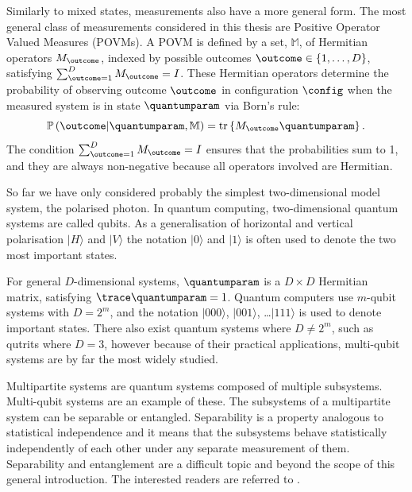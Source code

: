 Similarly to mixed states, measurements also have a more general form. The most general class of measurements considered in this thesis are Positive Operator Valued Measures (POVMs). A POVM is defined by a set, $\mathbb{M}$, of Hermitian operators $M_{\outcome}$, indexed by possible outcomes $\outcome\in\{1,\ldots,D\}$, satisfying $\sum_{\outcome=1}^{D} M_{\outcome} = I$. These Hermitian operators determine the probability of observing outcome $\outcome$ in configuration $\config$ when the measured system is in state $\quantumparam$ via Born's rule:
%
\begin{equation}
	\mathbb{P}\left(\outcome\vert\quantumparam,\mathbb{M}\right) = \text{tr}\left\{M_{\outcome}\quantumparam \right\}.
\end{equation}
%
The condition $\sum_{\outcome=1}^{D} M_{\outcome} = I$ ensures that the probabilities sum to 1, and they are always non-negative because all operators involved are Hermitian.

So far we have only considered probably the simplest two-dimensional model system, the polarised photon. In quantum computing, two-dimensional quantum systems are called qubits. As a generalisation of horizontal and vertical polarisation $\vert H \rangle$ and $\vert V \rangle$ the notation $\vert 0 \rangle$ and $\vert 1 \rangle$ is often used to denote the two most important states.

For general $D$-dimensional systems, $\quantumparam$ is a $D \times D$ Hermitian matrix, satisfying $\trace\quantumparam = 1$. Quantum computers use $m$-qubit systems with $D=2^m$, and the notation $\vert 000 \rangle$, $\vert 001 \rangle$, \ldots $\vert 111 \rangle$ is used to denote important states. There also exist quantum systems where $D\neq 2^m$, such as qutrits where $D=3$, however because of their practical applications, multi-qubit systems are by far the most widely studied.

Multipartite systems are quantum systems composed of multiple subsystems. Multi-qubit systems are an example of these. The subsystems of a multipartite system can be separable or entangled. Separability is a property analogous to statistical independence and it means that the subsystems behave statistically independently of each other under any separate measurement of them. Separability and entanglement are a difficult topic and beyond the scope of this general introduction. The interested readers are referred to \citep[Chapter 4]{Petz2008}.



